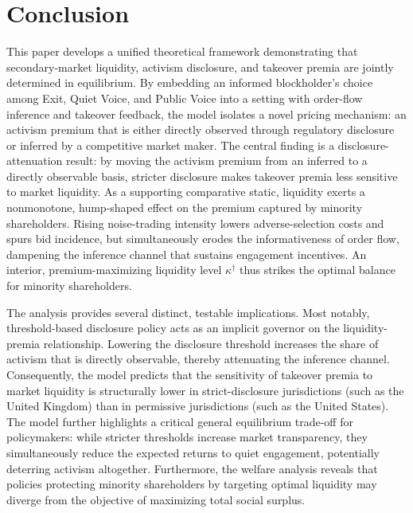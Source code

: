 \documentclass[11pt]{article}
\newcommand{\1}{\mathbf{1}}
\begin{document}
\section{Conclusion}
\label{sec:conclusion}

This paper develops a unified theoretical framework demonstrating that secondary-market liquidity, activism disclosure, and takeover premia are jointly determined in equilibrium. By embedding an informed blockholder's choice among Exit, Quiet Voice, and Public Voice into a setting with order-flow inference and takeover feedback, the model isolates a novel pricing mechanism: an activism premium that is either directly observed through regulatory disclosure or inferred by a competitive market maker. The central finding is a disclosure-attenuation result: by moving the activism premium from an inferred to a directly observable basis, stricter disclosure makes takeover premia less sensitive to market liquidity. As a supporting comparative static, liquidity exerts a nonmonotone, hump-shaped effect on the premium captured by minority shareholders. Rising noise-trading intensity lowers adverse-selection costs and spurs bid incidence, but simultaneously erodes the informativeness of order flow, dampening the inference channel that sustains engagement incentives. An interior, premium-maximizing liquidity level $\kappa^{\dagger}$ thus strikes the optimal balance for minority shareholders.

The analysis provides several distinct, testable implications. Most notably, threshold-based disclosure policy acts as an implicit governor on the liquidity-premia relationship. Lowering the disclosure threshold increases the share of activism that is directly observable, thereby attenuating the inference channel. Consequently, the model predicts that the sensitivity of takeover premia to market liquidity is structurally lower in strict-disclosure jurisdictions (such as the United Kingdom) than in permissive jurisdictions (such as the United States). The model further highlights a critical general equilibrium trade-off for policymakers: while stricter thresholds increase market transparency, they simultaneously reduce the expected returns to quiet engagement, potentially deterring activism altogether. Furthermore, the welfare analysis reveals that policies protecting minority shareholders by targeting optimal liquidity may diverge from the objective of maximizing total social surplus.
\end{document}
